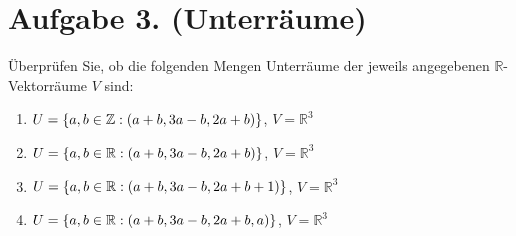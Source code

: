 \documentclass[german,12pt]{homework}
\DeclarePairedDelimiter{\enbrace}{(}{)}
\DeclarePairedDelimiter{\penbrace}{\{}{\}}
\begin{document}
    \section*{Aufgabe 3. (Unterräume)}

    \begin{problem}
        Überprüfen Sie, ob die folgenden Mengen Unterräume der jeweils
        angegebenen \(\mathbb{R}\)-Vektorräume \(V\) sind:
        \begin{enumerate}
            \item \(U = \penbrace*{a, b \in \mathbb{Z}: \enbrace*{a + b, 3a -
            b, 2a + b}}\), \quad \(V = \mathbb{R}^3\)
            \item \(U = \penbrace*{a, b \in \mathbb{R}: \enbrace*{a + b, 3a -
            b, 2a + b}}\), \quad \(V = \mathbb{R}^3\)
            \item \(U = \penbrace*{a, b \in \mathbb{R}: \enbrace*{a + b, 3a -
            b, 2a + b + 1}}\), \quad \(V = \mathbb{R}^3\)
            \item \(U = \penbrace*{a, b \in \mathbb{R}: \enbrace*{a + b, 3a -
            b, 2a + b, a}}\), \quad \(V = \mathbb{R}^3\)
        \end{enumerate}
    \end{problem}
\end{document}
